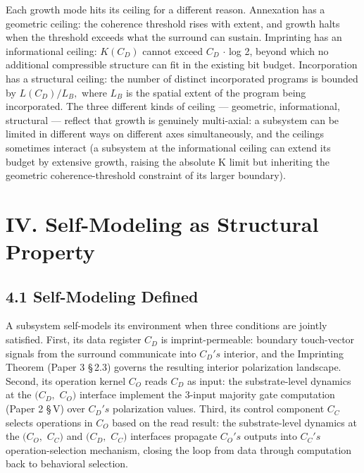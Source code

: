 \documentclass[11pt,oneside]{report}
\theoremstyle{definition}
\theoremstyle{remark}
\begin{document}
Each growth mode hits its ceiling for a different reason. Annexation has
a geometric ceiling: the coherence threshold rises with extent, and
growth halts when the threshold exceeds what the surround can sustain.
Imprinting has an informational ceiling: \ensuremath{K(C_{D})} cannot exceed
\textbar \ensuremath{C_{D}}\textbar{} \ensuremath{\cdot} log 2, beyond which no additional compressible
structure can fit in the existing bit budget. Incorporation has a
structural ceiling: the number of distinct incorporated programs is
bounded by \ensuremath{L(C_{D})/L_{B},} where \ensuremath{L_{B}} is the spatial extent of the
program being incorporated. The three different kinds of ceiling ---
geometric, informational, structural --- reflect that growth is
genuinely multi-axial: a subsystem can be limited in different ways on
different axes simultaneously, and the ceilings sometimes interact (a
subsystem at the informational ceiling can extend its budget by
extensive growth, raising the absolute K limit but inheriting the
geometric coherence-threshold constraint of its larger boundary).

\section*{IV. Self-Modeling as Structural Property}

\subsection*{4.1 Self-Modeling Defined}

A subsystem self-models its environment when three conditions are
jointly satisfied. First, its data register \ensuremath{C_{D}} is imprint-permeable:
boundary touch-vector signals from the surround communicate into \ensuremath{C_{D}'s}
interior, and the Imprinting Theorem (Paper 3 \S\,2.3) governs the
resulting interior polarization landscape. Second, its operation kernel
\ensuremath{C_{O}} reads \ensuremath{C_{D}} as input: the substrate-level dynamics at the \ensuremath{(C_{D},}
\ensuremath{C_{O})} interface implement the 3-input majority gate computation (Paper 2
\S\,V) over \ensuremath{C_{D}'s} polarization values. Third, its control component \ensuremath{C_{C}}
selects operations in \ensuremath{C_{O}} based on the read result: the substrate-level
dynamics at the \ensuremath{(C_{O},} \ensuremath{C_{C})} and \ensuremath{(C_{D},} \ensuremath{C_{C})} interfaces propagate
\ensuremath{C_{O}'s} outputs into \ensuremath{C_{C}'s} operation-selection mechanism, closing the
loop from data through computation back to behavioral selection.
\end{document}
